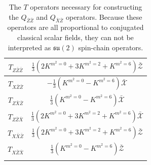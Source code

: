 %
%
\begin{table}
%
\begin{center}
%
\begingroup
\setlength{\tabcolsep}{7pt} %
\renewcommand{\arraystretch}{2.0} %
%
\begin{tabular}{ !{\vrule width 1.5pt}c!{\vrule width 1.5pt}c!{\vrule width 1.5pt} }
 	$T_{Z \bar{Z} \bar{Z}}$ & $\frac{1}{3} \left( 2 K^{m^2 = 0} + 3 K^{m^2 = 2} + K^{m^2 = 6} \right) \bar{\mathcal{Z}}$ \\
 	\hline
 	$T_{X \bar{Z} \bar{Z}}$ & $-\frac{1}{3} \left( K^{m^2=0} - K^{m^2=6} \right) \bar{\mathcal{X}}$ \\
 	\hline
 	$T_{Z \bar{X} \bar{Z}}$ & $\frac{1}{3} \left( K^{m^2=0} - K^{m^2=6} \right) \bar{\mathcal{X}}$ \\
	\hline 	
 	$T_{Z \bar{Z} \bar{X}}$ & $\frac{1}{3} \left( 2 K^{m^2 = 0} + 3 K^{m^2 = 2} + K^{m^2 = 6} \right) \bar{\mathcal{X}}$ \\
 	\hline
 	$T_{X \bar{X} \bar{Z}}$ & $\frac{1}{3} \left( 2 K^{m^2 = 0} + 3 K^{m^2 = 2} + K^{m^2 = 6} \right) \bar{\mathcal{Z}}$ \\
	\hline 	
 	$T_{X \bar{Z} \bar{X}}$ & $\frac{1}{3} \left( K^{m^2=0} - K^{m^2=6} \right) \bar{\mathcal{Z}}$ \\
\end{tabular}
%
\endgroup
%
\end{center}
%
\caption[$T$ operators necessary for constructing $Q_{\bar{Z} \bar{Z}}$ and $Q_{\bar{X} \bar{Z}}$]{The $T$ operators necessary for constructing the $Q_{\bar{Z} \bar{Z}}$ and $Q_{\bar{X} \bar{Z}}$ operators. Because these operators are all proportional to conjugated classical scalar fields, they can not be interpreted as $\mathfrak{su}(2)$ spin-chain operators.}
%
\label{tab:T-table-2}
%
\end{table}
%
%

